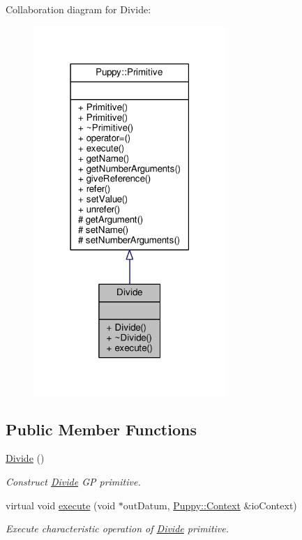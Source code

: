 Collaboration diagram for Divide\+:
\nopagebreak
\begin{figure}[H]
\begin{center}
\leavevmode
\includegraphics[width=207pt]{classDivide__coll__graph}
\end{center}
\end{figure}
\subsection*{Public Member Functions}
\begin{DoxyCompactItemize}
\item 
\hypertarget{classDivide_ac5f1271d02153b1aa1c7de17c7a09abd}{}\hyperlink{classDivide_ac5f1271d02153b1aa1c7de17c7a09abd}{Divide} ()\label{classDivide_ac5f1271d02153b1aa1c7de17c7a09abd}

\begin{DoxyCompactList}\small\item\em Construct \hyperlink{classDivide}{Divide} G\+P primitive. \end{DoxyCompactList}\item 
virtual void \hyperlink{classDivide_af5ed152cd9a4e65141a59ef78307e87f}{execute} (void $\ast$out\+Datum, \hyperlink{classPuppy_1_1Context}{Puppy\+::\+Context} \&io\+Context)
\begin{DoxyCompactList}\small\item\em Execute characteristic operation of \hyperlink{classDivide}{Divide} primitive. \end{DoxyCompactList}\end{DoxyCompactItemize}
